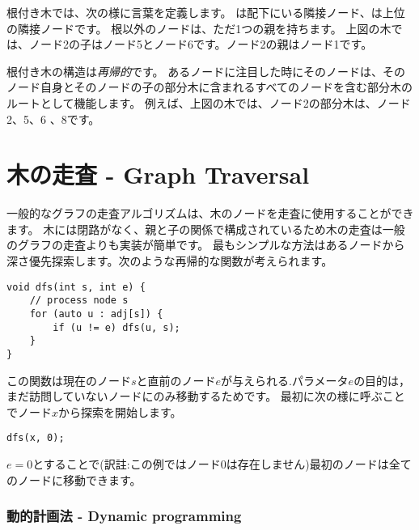 根付き木では、次の様に言葉を定義します。
は配下にいる隣接ノード、は上位の隣接ノードです。
根以外のノードは、ただ1つの親を持ちます。
上図の木では、ノード2の子はノード5とノード6です。ノード2の親はノード1です。


根付き木の構造は\emph{再帰的}です。
あるノードに注目した時にそのノードは、そのノード自身とそのノードの子の部分木に含まれるすべてのノードを含む部分木のルートとして機能します。
例えば、上図の木では、ノード2の部分木は、ノード2、5、6 、8です。

\begin{center}
\end{center}

\section{木の走査 - Graph Traversal}

一般的なグラフの走査アルゴリズムは、木のノードを走査に使用することができます。
木には閉路がなく、親と子の関係で構成されているため木の走査は一般のグラフの走査よりも実装が簡単です。
最もシンプルな方法はあるノードから深さ優先探索します。次のような再帰的な関数が考えられます。

\begin{lstlisting}
void dfs(int s, int e) {
    // process node s
    for (auto u : adj[s]) {
        if (u != e) dfs(u, s);
    }
}
\end{lstlisting}

この関数は現在のノード$s$と直前のノード$e$が与えられる.パラメータ$e$の目的は，
まだ訪問していないノードにのみ移動するためです。
最初に次の様に呼ぶことでノード$x$から探索を開始します。

\begin{lstlisting}
dfs(x, 0);
\end{lstlisting}

$e=0$とすることで(訳註:この例ではノード0は存在しません)最初のノードは全てのノードに移動できます。

\subsubsection{動的計画法 - Dynamic programming}

